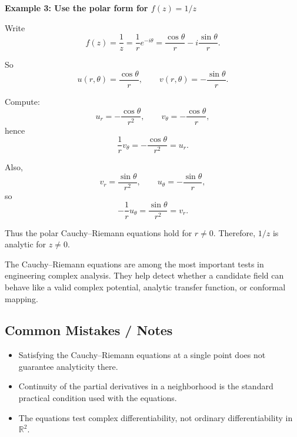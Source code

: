 \begin{examplebox}
    \textbf{Example 3: Use the polar form for $f(z)=1/z$}

    Write
    \[
        f(z)=\frac{1}{z}=\frac{1}{r}e^{-i\theta}
        =
        \frac{\cos\theta}{r}
        -i\frac{\sin\theta}{r}.
    \]

    So
    \[
        u(r,\theta)=\frac{\cos\theta}{r},
        \qquad
        v(r,\theta)=-\frac{\sin\theta}{r}.
    \]

    Compute:
    \[
        u_r=-\frac{\cos\theta}{r^2},
        \qquad
        v_\theta=-\frac{\cos\theta}{r},
    \]
    hence
    \[
        \frac{1}{r}v_\theta
        =
        -\frac{\cos\theta}{r^2}
        =
        u_r.
    \]

    Also,
    \[
        v_r=\frac{\sin\theta}{r^2},
        \qquad
        u_\theta=-\frac{\sin\theta}{r},
    \]
    so
    \[
        -\frac{1}{r}u_\theta
        =
        \frac{\sin\theta}{r^2}
        =
        v_r.
    \]

    Thus the polar Cauchy--Riemann equations hold for $r\neq 0$. Therefore, $1/z$ is analytic for $z\neq 0$.
\end{examplebox}

\begin{noteBox}
    The Cauchy--Riemann equations are among the most important tests in engineering complex analysis. They help detect whether a candidate field can behave like a valid complex potential, analytic transfer function, or conformal mapping.
\end{noteBox}

\subsection*{Common Mistakes / Notes}

\begin{itemize}
    \item Satisfying the Cauchy--Riemann equations at a single point does not guarantee analyticity there.
    \item Continuity of the partial derivatives in a neighborhood is the standard practical condition used with the equations.
    \item The equations test complex differentiability, not ordinary differentiability in $\mathbb{R}^2$.
\end{itemize}